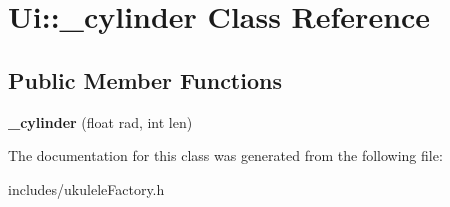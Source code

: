\hypertarget{class_ui_1_1__cylinder}{}\section{Ui\+:\+:\+\_\+cylinder Class Reference}
\label{class_ui_1_1__cylinder}
\subsection*{Public Member Functions}
\begin{DoxyCompactItemize}
\item 
\hypertarget{class_ui_1_1__cylinder_a4ed8af4165570023a87b8af5e450fafa}{}\label{class_ui_1_1__cylinder_a4ed8af4165570023a87b8af5e450fafa} 
{\bfseries \+\_\+cylinder} (float rad, int len)
\end{DoxyCompactItemize}


The documentation for this class was generated from the following file\+:\begin{DoxyCompactItemize}
\item 
includes/ukulele\+Factory.\+h\end{DoxyCompactItemize}
